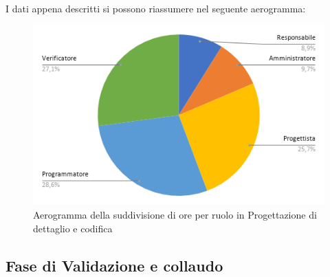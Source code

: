         I dati appena descritti si possono riassumere nel seguente aerogramma:
        \begin{figure}[!h]
            \vspace{5px}
            \includegraphics[scale=0.5]{../../../Images/Diagrammi/Diagramma a torta/ore codifica.png}
            \centering
            \caption{Aerogramma della suddivisione di ore per ruolo in Progettazione di dettaglio e codifica}
        \end{figure}  



\subsection{Fase di Validazione e collaudo}
